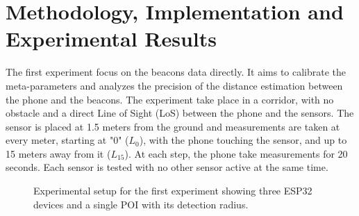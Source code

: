 \chapter{Methodology, Implementation and Experimental Results}
\label{chap:implementation}

The first experiment focus on the beacons data directly. It aims to calibrate the meta-parameters and analyzes the precision of the distance estimation between the phone and the beacons. The experiment take place in a corridor, with no obstacle and a direct Line of Sight (LoS) between the phone and the sensors. The sensor is placed at 1.5 meters from the ground and measurements are taken at every meter, starting at "0" ($L_0$), with the phone touching the sensor, and up to 15 meters away from it ($L_{15}$). At each step, the phone take measurements for 20 seconds. Each sensor is tested with no other sensor active at the same time.

\begin{figure}[H]
    \centering
    \caption{Experimental setup for the first experiment showing three ESP32 devices and a single POI with its detection radius.}
    \label{fig:exp1_setup}
\end{figure}

